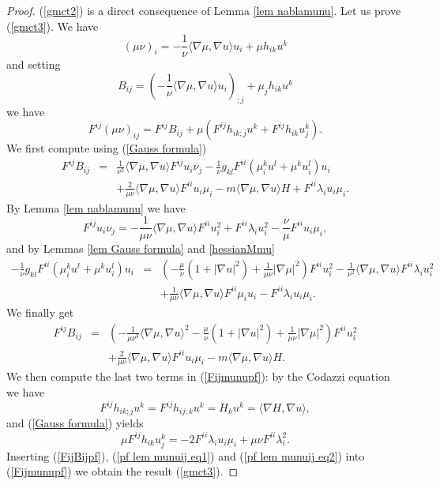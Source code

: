 \documentclass[10pt,reqno,oneside]{amsart}
\theoremstyle{definition}
\theoremstyle{remark}
\begin{document}
\begin{proof}
(\ref{gmct2}) is a direct consequence of Lemma \ref{lem nablamunu}. Let us prove (\ref{gmct3}). We have
$$(\mu\nu)_i=-\frac{1}{\nu}\langle\nabla\mu,\nabla u\rangle u_i+\mu h_{ik}u^k$$
and setting
$$B_{ij}=\left(-\frac{1}{\nu}\langle\nabla\mu,\nabla u\rangle u_i\right)_{;j}+\mu_j h_{ik}u^k$$
we have 
\begin{equation}\label{Fijmunupf}
F^{ij}(\mu\nu)_{ij}=F^{ij}B_{ij}+\mu(F^{ij}h_{ik;j}u^k+F^{ij}h_{ik}u^k_{j}).
\end{equation}
We first compute using (\ref{Gauss formula})
\begin{eqnarray*}
F^{ij}B_{ij}&=&\frac{1}{\nu^2}\langle\nabla\mu,\nabla u\rangle F^{ij}u_i\nu_j-\frac{1}{\nu}g_{kl}F^{ii}\left(\mu_i^ku^l+\mu^ku_i^l\right)u_i\\
&&+\frac{2}{\mu\nu}\langle\nabla\mu,\nabla u\rangle F^{ii}u_i\mu_i-m\langle\nabla\mu,\nabla u\rangle H+F^{ii}\lambda_iu_i\mu_i.
\end{eqnarray*}
By Lemma \ref{lem nablamunu} we have 
$$F^{ij}u_i\nu_j=-\frac{1}{\mu\nu}\langle\nabla\mu,\nabla u\rangle F^{ii}u_i^2+F^{ii}\lambda_iu_i^2-\frac{\nu}{\mu}F^{ii}u_i\mu_i,$$
and by Lemmas \ref{lem Gauss formula} and \ref{hessianMmu}
\begin{eqnarray*}
-\frac{1}{\nu}g_{kl}F^{ii}\left(\mu_i^ku^l+\mu^ku_i^l\right)u_i&=&\left(-\frac{\mu}{\nu}(1+|\nabla u|^2)+\frac{1}{\mu\nu}|\nabla\mu|^2\right)F^{ii}u_i^2-\frac{1}{\nu^2}\langle\nabla\mu,\nabla u\rangle F^{ii}\lambda_iu_i^2\\
&&+\frac{1}{\mu\nu}\langle\nabla\mu,\nabla u\rangle F^{ii}\mu_iu_i-F^{ii}\lambda_iu_i\mu_i.
\end{eqnarray*}
We finally get
\begin{eqnarray}
F^{ij}B_{ij}&=&\left(-\frac{1}{\mu\nu^3}\langle\nabla\mu,\nabla u\rangle^2-\frac{\mu}{\nu}(1+|\nabla u|^2)+\frac{1}{\mu\nu}|\nabla\mu|^2\right)F^{ii}u_i^2\nonumber\\
&&+\frac{2}{\mu\nu}\langle\nabla\mu,\nabla u\rangle F^{ii}u_i\mu_i-m\langle\nabla\mu,\nabla u\rangle H.\label{FijBijpf}
\end{eqnarray}
We then compute the last two terms in (\ref{Fijmunupf}): by the Codazzi equation we have
\begin{equation}\label{pf lem munuij eq1}
F^{ij}h_{ik;j}u^k=F^{ij}h_{ij;k}u^k=H_ku^k=\langle\nabla H,\nabla u\rangle,
\end{equation}
and (\ref{Gauss formula}) yields
\begin{equation}\label{pf lem munuij eq2}
\mu F^{ij}h_{ik}u^k_{j}=-2F^{ii}\lambda_iu_i\mu_i+\mu\nu F^{ii}\lambda_i^2.
\end{equation}
Inserting (\ref{FijBijpf}), (\ref{pf lem munuij eq1}) and (\ref{pf lem munuij eq2}) into (\ref{Fijmunupf}) we obtain the result (\ref{gmct3}). 
\end{proof}
\end{document}
